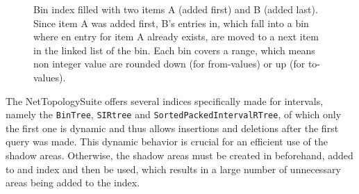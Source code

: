 \begin{figure}[h]
\begin{figcenter}
			\end{figcenter}
			\caption{Bin index filled with two items A (added first) and B (added last). Since item A was added first, B's entries in, which fall into a bin where en entry for item A already exists, are moved to a next item in the linked list of the bin. Each bin covers a range, which means non integer value are rounded down (for from-values) or up (for to-values).}
			\label{fig:bin-index}
		\end{figure}
		
		The NetTopologySuite offers several indices specifically made for intervals, namely the \texttt{BinTree}, \texttt{SIRtree} and \texttt{SortedPackedIntervalRTree}, of which only the first one is dynamic and thus allows insertions and deletions after the first query was made.
		This dynamic behavior is crucial for an efficient use of the shadow areas.
		Otherwise, the shadow areas must be created in beforehand, added to and index and then be used, which results in a large number of unnecessary areas being added to the index.
		
